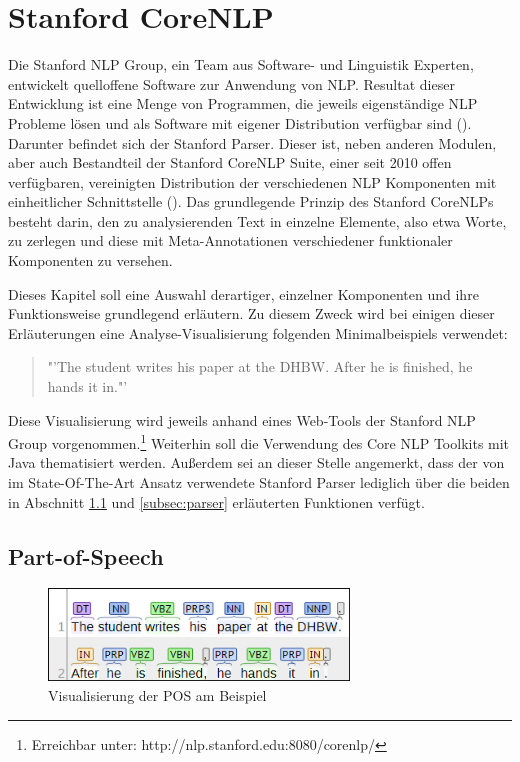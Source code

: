\section{Stanford CoreNLP}
\label{sec:stanfordparser}

Die Stanford \ac{NLP} Group, ein Team aus Software- und Linguistik Experten, entwickelt quelloffene Software zur Anwendung von \ac{NLP}. Resultat dieser Entwicklung ist eine Menge von Programmen, die jeweils eigenständige \ac{NLP} Probleme lösen und als Software mit eigener Distribution verfügbar sind (\cite[vgl.][1 ff.]{STANFORDNLPTEAM}).  Darunter befindet sich der Stanford Parser. Dieser ist, neben anderen Modulen, aber auch Bestandteil der Stanford CoreNLP Suite, einer seit 2010 offen verfügbaren, vereinigten Distribution der verschiedenen \ac{NLP} Komponenten mit einheitlicher Schnittstelle (\cite[vgl.][1 ff.]{STANFORDNLP}). Das grundlegende Prinzip des Stanford CoreNLPs besteht darin, den zu analysierenden Text in einzelne Elemente, also etwa Worte, zu zerlegen und diese mit Meta-Annotationen verschiedener funktionaler Komponenten zu versehen.\par
Dieses Kapitel soll eine Auswahl derartiger, einzelner Komponenten und ihre Funktionsweise grundlegend erläutern. Zu diesem Zweck wird bei einigen dieser Er\-läu\-ter\-ung\-en eine Analyse-Visualisierung folgenden Minimalbeispiels verwendet:
\begin{quote}
"'The student writes his paper at the DHBW. After he is finished, he hands it in."'
\end{quote} Diese Visualisierung wird jeweils anhand eines Web-Tools der Stanford \ac{NLP} Group vorgenommen.\footnote{Erreichbar unter: http://nlp.stanford.edu:8080/corenlp/} Weiterhin soll die Verwendung des Core NLP Toolkits mit Java thematisiert werden. Außerdem sei an dieser Stelle angemerkt, dass der von im State-Of-The-Art Ansatz verwendete Stanford Parser lediglich über die beiden in Abschnitt \ref{subsec:pos} und \ref{subsec:parser} erläuterten Funktionen verfügt.
\newpage
\subsection{Part-of-Speech}
\label{subsec:pos}

\begin{figure}
\includegraphics[width=8cm]{pictures/POS.png}
\caption{Visualisierung der POS am Beispiel}
\label{fig:POS}
\end{figure}

